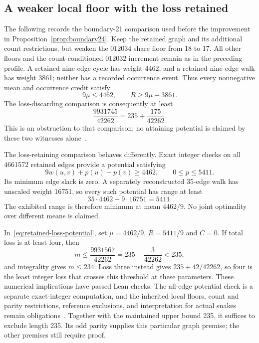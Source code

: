 \documentclass[11pt,a4paper]{article}
\theoremstyle{definition}
\theoremstyle{remark}
\begin{document}
\subsection{A weaker local floor with the loss retained}\label{sec:retained-loss-comparison}
The following records the boundary-21 comparison used before the improvement
in Proposition~\ref{prop:boundary24}. Keep the retained graph and its additional count restrictions, but weaken
the $012034$ share floor from 18 to 17. All other floors and the
count-conditioned $012032$ increment remain as in the preceding profile.
A retained nine-edge cycle has weight 4462, and a retained nine-edge walk
has weight 3861; neither has a recorded occurrence event. Thus every
nonnegative mean and occurrence credit satisfy
\[
9\mu\le4462,\qquad R\ge9\mu-3861.
\]
The loss-discarding comparison is consequently at least
\[
\frac{9931745}{42262}=235+\frac{175}{42262}.
\]
This is an obstruction to that comparison; no attaining potential is
claimed by these two witnesses alone~\cite{floor158archive}.

The loss-retaining comparison behaves differently. Exact integer checks
on all 4661572 retained edges provide a potential satisfying
\[
9w(u,v)+p(u)-p(v)\ge4462,\qquad 0\le p\le5411.
\]
Its minimum edge slack is zero. A separately reconstructed 35-edge walk
has unscaled weight 16751, so every such potential has range at least
\[
35\cdot4462-9\cdot16751=5411.
\]
The exhibited range is therefore minimum at mean $4462/9$. No joint
optimality over different means is claimed.

In~\eqref{eq:retained-loss-potential}, set $\mu=4462/9$, $R=5411/9$
and $C=0$. If total loss is at least four, then
\[
m\le\frac{9931567}{42262}=235-\frac3{42262}<235,
\]
and integrality gives $m\le234$. Loss three instead gives
$235+42/42262$, so four is the least integer loss that crosses this
threshold at these parameters. These numerical implications have passed
Lean checks. The all-edge potential check is a separate exact-integer
computation, and the inherited local floors, count and parity restrictions,
reference exclusions, and interpretation for actual snakes remain
obligations~\cite{loss164archive,threshold165archive}.
Together with the maintained upper bound 235, it suffices to exclude
length 235. Its odd parity supplies this particular graph premise;
the other premises still require proof.
\end{document}

